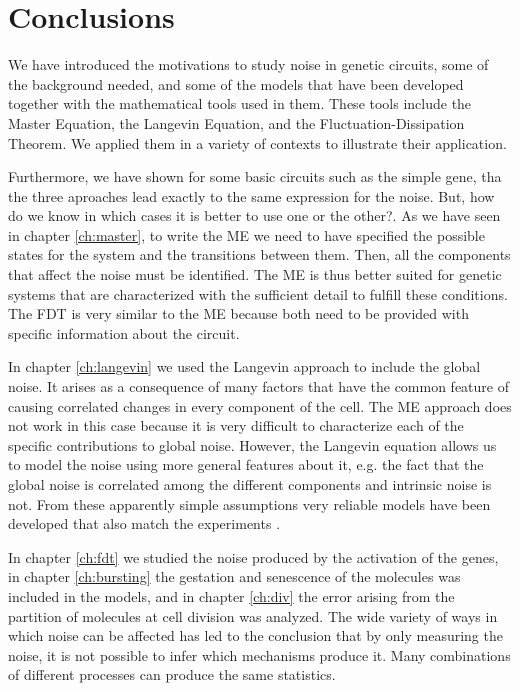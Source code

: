 \chapter*{Conclusions}

We have introduced the motivations to study noise in genetic circuits, some of the background needed, and some of the models that have been developed together with the mathematical tools used in them. These tools include the Master Equation, the Langevin Equation, and the Fluctuation-Dissipation Theorem. We applied them in a variety of contexts to illustrate their application.

Furthermore, we have shown for some basic circuits such as the simple gene, tha the three aproaches lead exactly to the same expression for the noise. But, how do we know in which cases it is better to use one or the other?. As we have seen in chapter \ref{ch:master}, to write the ME we need to have specified the possible states for the system and the transitions between them. Then, all the components that affect the noise must be identified. The ME is thus better suited for genetic systems that are characterized with the sufficient detail to fulfill these conditions. The FDT is very similar to the ME because both need to be provided with specific information about the circuit.

In chapter \ref{ch:langevin} we used the Langevin approach to include the global noise. It arises as a consequence of many factors that have the common feature of causing correlated changes in every component of the cell. The ME approach does not work in this case because it is very difficult to characterize each of the specific contributions to global noise. However, the Langevin equation allows us to model the noise using more general features about it, e.g. the fact that the global noise is correlated among the different components and intrinsic noise is not. From these apparently simple assumptions very reliable models have been developed that also match the experiments \cite{pedraza05}.

In chapter \ref{ch:fdt} we studied the noise produced by the activation of the genes, in chapter \ref{ch:bursting} the gestation and senescence of the molecules was included in the models, and in chapter \ref{ch:div} the error arising from the partition of molecules at cell division was analyzed. The wide variety of ways in which noise can be affected has led to the conclusion that by only measuring the noise, it is not possible to infer which mechanisms produce it. Many combinations of different processes can produce the same statistics.

